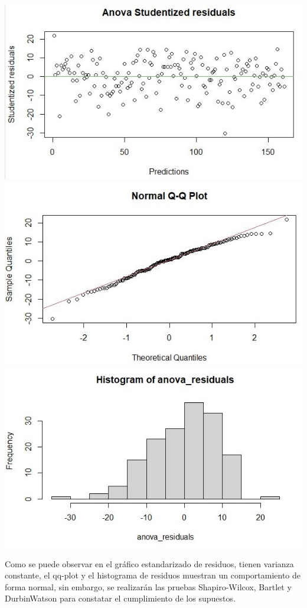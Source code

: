 \documentclass[a4paper,10pt,twocolumn]{article}
\begin{document}
\includegraphics[scale=0.5]{./imgs/anova_residuals.jpg}
\includegraphics[scale=0.5]{./imgs/anova_qq.jpg}
\includegraphics[scale=0.5]{./imgs/anova_hist.jpg}

Como se puede observar en el gráfico estandarizado de residuos, tienen varianza constante, el qq-plot y el histograma de residuos
muestran un comportamiento de forma normal, sin embargo, se realizarán las pruebas Shapiro-Wilcox, Bartlet y DurbinWatson para constatar el cumplimiento de los supuestos.
\end{document}

